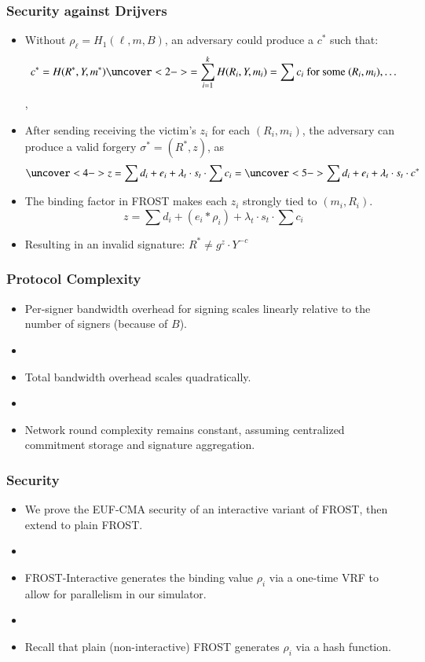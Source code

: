 \documentclass[hyperref={pdfpagelabels=true},table,dvipsnames,14pt,aspectratio=169]{beamer}
\begin{document}
\begin{frame}
  \frametitle{Security against Drijvers}
  \small

  \begin{itemize}
    \item<1->[] Without $\rho_\ell = H_1(\ell, m, B) $,
  an adversary could produce a $c^*$ such that:
      \[ c^*= H(R^*, Y, m^*) \uncover<2->{ = \sum_{i=1}^{k} H(R_i, Y, m_i)  =
      \sum c_i  \text{ for some } (R_i, m_i), \dots } \],
    \item<3->[] After sending receiving the victim's $z_i$ for each $(R_i, m_i)$, the
  adversary can produce a valid forgery $\sigma^*=(R^*, z)$, as
      \[ \uncover<4-> {z = \sum d_i + e_i + \lambda_t \cdot s_t \cdot \sum c_i} = \uncover<5->
      { \sum d_i + e_i + \lambda_t \cdot s_t \cdot c^*} \]
    \item<6->[] The binding factor in FROST makes each $z_i$ strongly tied to
      $(m_i, R_i)$.
      \[ z = \sum d_i + (e_i * \rho_i) + \lambda_t \cdot s_t \cdot \sum c_i  \]
    \item<7->[] Resulting in an invalid signature: $R^* \neq g^z \cdot Y^{-c}$
  \end{itemize}
\end{frame}

\begin{frame}
  \frametitle{Protocol Complexity}

  \begin{itemize}
    \item<1-> Per-signer bandwidth overhead for signing scales linearly
      relative to the number of signers (because of $B$).
    \item[]~
    \item<2-> Total bandwidth overhead scales quadratically.
    \item[]~
    \item<3-> Network round complexity remains constant, assuming centralized
      commitment storage and signature aggregation.
  \end{itemize}

\end{frame}

\begin{frame}
  \frametitle{Security}

  \begin{itemize}
    \item<1-> We prove the EUF-CMA security of an interactive variant of FROST,
      then extend to plain FROST.
    \item[]
    \item<2-> FROST-Interactive generates the
      binding value $\rho_i$ via a one-time VRF to allow for parallelism in our
      simulator.
    \item[]
    \item<3->Recall that plain (non-interactive) FROST generates $\rho_i$ via a
      hash function.
  \end{itemize}
\end{frame}
\end{document}
